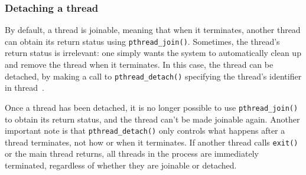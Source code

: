 \subsubsection{Detaching a thread}
\label{sec:detaching-thread}
By default, a thread is joinable, meaning that when it terminates, another
thread can obtain its return status using \texttt{pthread\_join()}.
Sometimes, the thread’s return status is irrelevant: one simply wants the system
to automatically clean up and remove the thread when it terminates.
In this case, the thread can be detached,
by making a call to \texttt{pthread\_detach()} specifying the thread’s identifier in thread~\cite{kerrisk2010linux}.
%

Once a thread has been detached, it is no longer possible to use \texttt{pthread\_join()}
to obtain its return status, and the thread can't be made joinable again.
Another important note is that \texttt{pthread\_detach()} only controls what
happens after a thread terminates, not how or when it terminates. If another
thread calls \texttt{exit()} or the main thread returns, 
all threads in the process are immediately terminated, regardless of whether they are joinable or detached.

